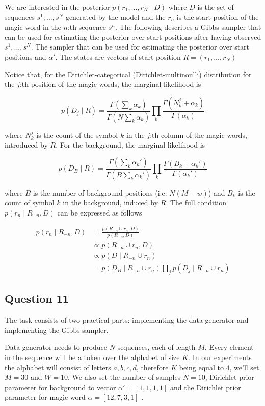 \documentclass[]{article}
\begin{document}
We are interested in the posterior $p(r_1,...,r_N \mid D)$ where $D$ is the set of sequences $ s^1, ..., s^N$ generated by the model and the $r_n$ is the start position of the magic word in the $n$:th sequence $s^n$. The following describes a Gibbs sampler that can be used for estimating the posterior over start positions after having observed $s^1, ..., s^N$. The sampler that can be used for estimating the posterior over start positions and $\alpha'$. The states are vectors of start position $R= (r_1,...,r_N)$

Notice that, for the Dirichlet-categorical (Dirichlet-multinoulli) distribution for the $j$:th position of the magic words, the marginal likelihood is 

$$ p(D_j \mid R) = \frac{\Gamma(\sum_k \alpha_k)}{\Gamma(N \sum_k \alpha_k)} \prod_k \frac{\Gamma( N_k^j + \alpha_k)}{\Gamma(\alpha_k)} $$

where $N_k^j$ is the count of the symbol $k$ in the $j$:th column of the magic words, introduced by $R$. For the background, the marginal likelihood is 

$$ p(D_B \mid R) = \frac{\Gamma(\sum_k \alpha_k')}{\Gamma(B \sum_k \alpha_k')} \prod_k \frac{\Gamma( B_k + \alpha_k')}{\Gamma(\alpha_k')} $$

where $B$ is the number of background positions (i.e. $N(M-w)$) and $B_k$ is the count of symbol $k$ in the background, induced by $R$. The full condition $p(r_n \mid R_{-n}, D)$ can be expressed as follows

\begin{align*}
p(r_n \mid R_{-n}, D) &= \frac{p(R_{-n} \cup r_n, D)}{p(R_{-n}, D)} \\
& \propto p(R_{-n} \cup r_n, D) \\
& \propto p(D \mid R_{-n} \cup r_n) \\
& = p(D_B \mid R_{-n} \cup r_n) \prod_j p(D_j \mid R_{-n} \cup r_n)
\end{align*}


\subsection*{Question 11}

The task consists of two practical parts: implementing the data generator and implementing the Gibbs sampler. 

Data generator needs to produce $N$ sequences, each of length $M$. Every element in the sequence will be a token over the alphabet of size $K$. In our experiments the alphabet will consist of letters $a,b,c,d$, therefore $K$ being equal to $4$, we'll set $M=30$ and $W=10$. We also set the number of samples $N=10$, Dirichlet prior parameter for background  to vector $\alpha' = [1,1,1,1]$ and the Dirichlet prior parameter for magic word  $\alpha = [12,7,3,1]$ .
\end{document}
